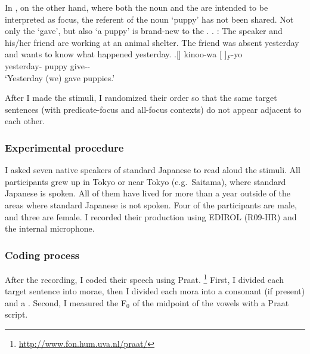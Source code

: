 In \Next, on the other hand,
where both the noun and the  are intended to be interpreted as focus,
the referent of the noun  `puppy' has not been shared.
Not only the  `gave', but also `a puppy' is brand-new to the .
%
\ex.\label{koinuf}
 : The speaker and his/her friend are working at an animal shelter. The friend was absent yesterday and wants to know what happened yesterday.
\ag.[] kinoo-wa [ ]$_{F}$-yo \\
yesterday- puppy give-- \\
`Yesterday (we) gave puppies.'



After I made the stimuli,
I randomized their order so that
the same target sentences (with predicate-focus and all-focus contexts)
do not appear adjacent to each other.

\subsubsection{Experimental procedure}\label{Int:IUISUnitExp:Meth:Proc}

I asked seven native speakers of standard Japanese
to read aloud the stimuli.
All participants grew up in Tokyo or near Tokyo (e.g.\ Saitama), where standard Japanese is spoken.
All of them have lived for more than a year outside of the areas where standard Japanese is not spoken.
Four of the participants are male, and three are female.
I recorded their production using EDIROL (R09-HR) and the internal microphone.

\subsubsection{Coding process}\label{Int:IUISUnitExp:Meth:Anot}

After the recording, I coded their speech using Praat.%
\footnote{\url{http://www.fon.hum.uva.nl/praat/}}
First, I divided each target sentence into morae,
then I divided each mora into a consonant (if present) and a .
Second, I measured the F$_{0}$ of the midpoint of the vowels with a Praat script.


